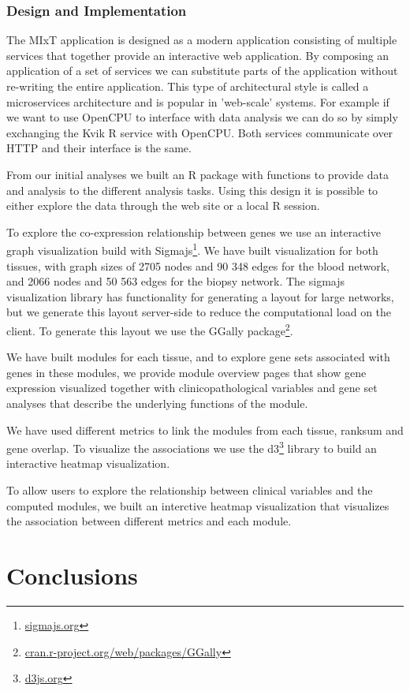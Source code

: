 \subsubsection*{Design and Implementation}
The MIxT application is designed as a modern application consisting of multiple
services that together provide an interactive web application. By composing an 
application of a set of services we can substitute parts of the application without 
re-writing the entire application. This type of architectural style is called a
microservices architecture and is popular in 'web-scale' systems. For example if
we want to use OpenCPU to interface with data analysis we can do so by simply
exchanging the Kvik R service with OpenCPU. Both services communicate over HTTP
and their interface is the same. 

From our initial analyses we built
an R package with functions to provide data and analysis to the different
analysis tasks. Using this design it is possible to either explore the data
through the web site or a local R session. 

To explore the co-expression relationship between genes we use an interactive
graph visualization build with Sigmajs\footnote{\url{sigmajs.org}}. We have
built visualization for both tissues, with graph sizes of 2705 nodes and 90 348
edges for the blood network, and 2066 nodes and 50 563 edges for the biopsy
network. The sigmajs visualization library has functionality for generating a
layout for large networks, but we generate this layout server-side to reduce the
computational load on the client. To generate this layout we use the GGally
package\footnote{\url{cran.r-project.org/web/packages/GGally}}. 

We have built modules for each tissue, and to explore gene sets associated with
genes in these modules, we provide module overview pages that show gene
expression visualized together with clinicopathological variables and gene set
analyses that describe the underlying functions of the module. 

We have used different metrics to link the modules from each tissue, ranksum and
gene overlap. To visualize the associations we use the
d3\footnote{\url{d3js.org}} library to build an interactive heatmap
visualization. 

To allow users to explore the relationship between clinical variables and the
computed modules, we built an interctive heatmap visualization that visualizes
the association between different metrics and each module. 



\section*{Conclusions}
